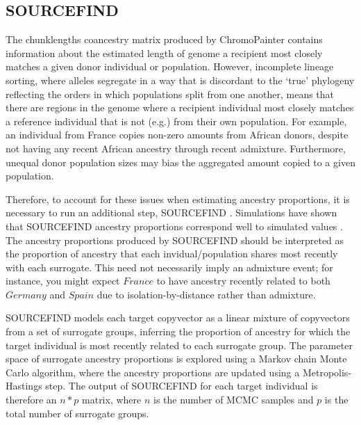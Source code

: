 \subsection{SOURCEFIND}

The chunklengths coancestry matrix produced by ChromoPainter contains information about the estimated length of genome a recipient most closely matches a given donor individual or population. However, incomplete lineage sorting, where alleles segregate in a way that is discordant to the `true' phylogeny reflecting the orders in which populations split from one another, means that there are regions in the genome where a recipient individual most closely matches a reference individual that is not (e.g.) from their own population. For example, an individual from France copies non-zero amounts from African donors, despite not having any recent African ancestry through recent admixture. Furthermore, unequal donor population sizes may bias the aggregated amount copied to a given population. 

Therefore, to account for these issues when estimating ancestry proportions, it is necessary to run an additional step, SOURCEFIND \cite{Chacon-Duque2018}. Simulations have shown that SOURCEFIND ancestry proportions correspond well to simulated values \cite{Chacon-Duque2018}. The ancestry proportions produced by SOURCEFIND should be interpreted as the proportion of ancestry that each invidual/population shares most recently with each surrogate. This need not necessarily imply an admixture event; for instance, you might expect $France$ to have ancestry recently related to both $Germany$ and $Spain$ due to isolation-by-distance rather than admixture. 

SOURCEFIND models each target copyvector as a linear mixture of copyvectors from a set of surrogate groups, inferring the proportion of ancestry for which the target individual is most recently related to each surrogate group. The parameter space of surrogate ancestry proportions is explored using a Markov chain Monte Carlo algorithm, where the ancestry proportions are updated using a Metropolis-Hastings step. The output of SOURCEFIND for each target individual is therefore an $n*p$ matrix, where $n$ is the number of MCMC samples and $p$ is the total number of surrogate groups. 

